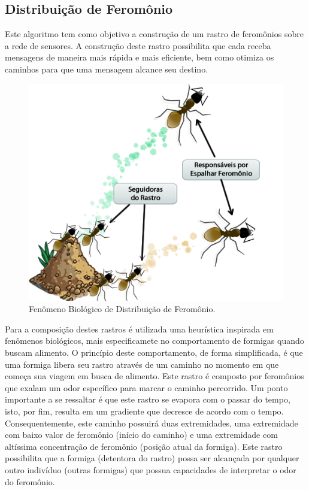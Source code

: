 \subsection{Distribuição de Feromônio}
Este algoritmo tem como objetivo a construção de um rastro de feromônios sobre a rede de sensores. A construção deste rastro possibilita que cada \vant receba mensagens de
maneira mais rápida e mais eficiente, bem como otimiza os caminhos para que uma mensagem alcance seu destino.

 \begin{figure}
 \centering
 \includegraphics[width=12cm]{pictures/ants.png}
 \caption{Fenômeno Biológico de Distribuição de Feromônio.}
  \label{fig:ants}
 \end{figure}

Para a composição destes rastros é utilizada uma heurística inspirada em fenômenos biológicos, mais especificamete no comportamento de formigas quando buscam alimento.
O princípio deste comportamento, de forma simplificada,  é que uma formiga libera seu rastro através de um caminho no momento em que começa sua viagem em busca de alimento. Este rastro é composto por feromônios que exalam um odor específico para marcar o caminho percorrido. Um ponto importante a se ressaltar é que este rastro se evapora com o passar do tempo, isto, por fim, resulta em um gradiente que decresce de acordo com o tempo. Consequentemente, este caminho possuirá duas extremidades, uma extremidade com baixo valor de feromônio (início do caminho) e uma extremidade com altíssima concentração de feromônio (posição atual da formiga). Este rastro possibilita que a formiga (detentora do rastro) possa ser alcançada por qualquer outro indivíduo (outras formigas) que possua capacidades de interpretar o odor do feromônio.

